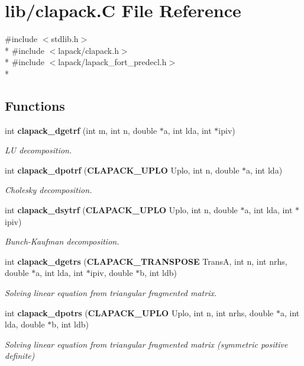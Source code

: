 \section{lib/clapack.C File Reference}
\label{d2/de8/clapack_8C}
{\ttfamily \#include $<$stdlib.\-h$>$}\\*
{\ttfamily \#include $<$lapack/clapack.\-h$>$}\\*
{\ttfamily \#include $<$lapack/lapack\-\_\-fort\-\_\-predecl.\-h$>$}\\*
\subsection*{Functions}
\begin{DoxyCompactItemize}
\item 
int {\bf clapack\-\_\-dgetrf} (int m, int n, double $\ast$a, int lda, int $\ast$ipiv)
\begin{DoxyCompactList}\small\item\em L\-U decomposition. \end{DoxyCompactList}\item 
int {\bf clapack\-\_\-dpotrf} ({\bf C\-L\-A\-P\-A\-C\-K\-\_\-\-U\-P\-L\-O} Uplo, int n, double $\ast$a, int lda)
\begin{DoxyCompactList}\small\item\em Cholesky decomposition. \end{DoxyCompactList}\item 
int {\bf clapack\-\_\-dsytrf} ({\bf C\-L\-A\-P\-A\-C\-K\-\_\-\-U\-P\-L\-O} Uplo, int n, double $\ast$a, int lda, int $\ast$ipiv)
\begin{DoxyCompactList}\small\item\em Bunch-\/\-Kaufman decomposition. \end{DoxyCompactList}\item 
int {\bf clapack\-\_\-dgetrs} ({\bf C\-L\-A\-P\-A\-C\-K\-\_\-\-T\-R\-A\-N\-S\-P\-O\-S\-E} Trans\-A, int n, int nrhs, double $\ast$a, int lda, int $\ast$ipiv, double $\ast$b, int ldb)
\begin{DoxyCompactList}\small\item\em Solving linear equation from triangular fragmented matrix. \end{DoxyCompactList}\item 
int {\bf clapack\-\_\-dpotrs} ({\bf C\-L\-A\-P\-A\-C\-K\-\_\-\-U\-P\-L\-O} Uplo, int n, int nrhs, double $\ast$a, int lda, double $\ast$b, int ldb)
\begin{DoxyCompactList}\small\item\em Solving linear equation from triangular fragmented matrix (symmetric positive definite) \end{DoxyCompactList}\item 

\end{DoxyCompactItemize}
